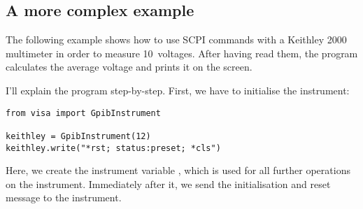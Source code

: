 \documentclass{howto}
\begin{document}
\subsection{A more complex example}
\label{sec:more-complex-example}

The following example shows how to use SCPI commands with a Keithley 2000
multimeter in order to measure 10~voltages.  After having read them, the
program calculates the average voltage and prints it on the screen.

I'll explain the program step-by-step.  First, we have to initialise the
instrument:
\begin{verbatim}
from visa import GpibInstrument

keithley = GpibInstrument(12)
keithley.write("*rst; status:preset; *cls")
\end{verbatim}
Here, we create the instrument variable , which is used for all
further operations on the instrument.  Immediately after it, we send the
initialisation and reset message to the instrument.
\end{document}
